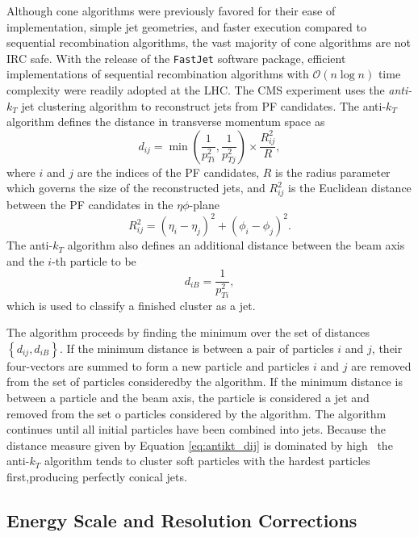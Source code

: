 Although cone algorithms were previously favored for their ease of implementation, simple jet geometries, and faster execution compared to sequential recombination algorithms, the vast majority of cone algorithms are not IRC safe. With the release of the \texttt{FastJet}\cite{FASTJET} software package, efficient implementations of sequential recombination algorithms with $\mathcal{O}(n \log n)$ time complexity were readily adopted at the LHC. The CMS experiment uses the \textit{anti-$k_{T}$} jet clustering algorithm\cite{ANTIKT} to reconstruct jets from PF candidates. The anti-$k_{T}$ algorithm defines the distance in transverse momentum space as
\begin{equation}
  d_{ij} = \min \left( \frac{1}{p_{Ti}^{2}}, \frac{1}{p_{Tj}^{2}} \right) \times \frac{R_{ij}^{2}}{R},
  \label{eq:antikt_dij}
\end{equation}
where $i$ and $j$ are the indices of the PF candidates, $R$ is the radius parameter which governs the size of the reconstructed jets, and $R_{ij}^{2}$ is the Euclidean distance between the PF candidates in the $\eta\phi$-plane
\begin{equation}
  R_{ij}^{2} = \left( \eta_{i} - \eta_{j} \right)^{2} + \left( \phi_{i} - \phi_{j} \right)^{2}.
  \label{eq:deltaR2}
\end{equation}
The anti-$k_{T}$ algorithm also defines an additional distance between the beam axis and the $i$-th particle to be
\begin{equation}
  d_{iB} = \frac{1}{p_{Ti}^{2}},
  \label{eq:antikt_diB}
\end{equation}
which is used to classify a finished cluster as a jet.

The algorithm proceeds by finding the minimum over the set of distances $\left\{ d_{ij}, d_{iB} \right\}$. If the minimum distance is between a pair of particles $i$ and $j$, their four-vectors are summed to form a new particle and particles $i$ and $j$ are removed from the set of particles consideredby the algorithm. If the minimum distance is between a particle and the beam axis, the particle is considered a jet and removed from the set o particles considered by the algorithm. The algorithm continues until all initial particles have been combined into jets. Because the distance measure given by Equation \ref{eq:antikt_dij} is dominated by high \pT\, the anti-$k_{T}$ algorithm tends to cluster soft particles with the hardest particles first,producing perfectly conical jets.

\subsection{Energy Scale and Resolution Corrections} \label{jesjer}

